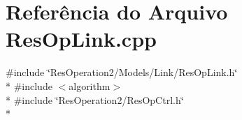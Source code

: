 \section{Referência do Arquivo Res\+Op\+Link.\+cpp}
\label{_res_op_link_8cpp}
{\ttfamily \#include \char`\"{}Res\+Operation2/\+Models/\+Link/\+Res\+Op\+Link.\+h\char`\"{}}\\*
{\ttfamily \#include $<$algorithm$>$}\\*
{\ttfamily \#include \char`\"{}Res\+Operation2/\+Res\+Op\+Ctrl.\+h\char`\"{}}\\*
